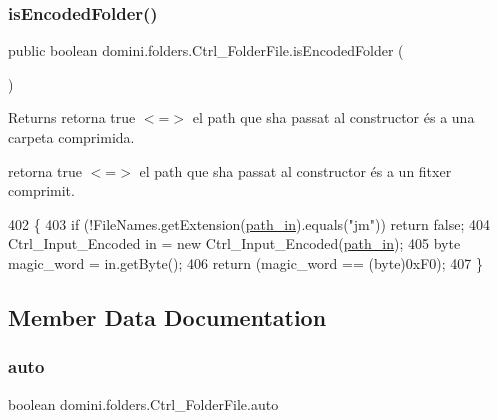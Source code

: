 \subsubsection{\texorpdfstring{is\+Encoded\+Folder()}{isEncodedFolder()}}
{\footnotesize\ttfamily public boolean domini.\+folders.\+Ctrl\+\_\+\+Folder\+File.\+is\+Encoded\+Folder (\begin{DoxyParamCaption}{ }\end{DoxyParamCaption})\hspace{0.3cm}{\ttfamily [inline]}}

\begin{DoxyReturn}{Returns}
retorna true $<$=$>$ el path que s\textquotesingle{}ha passat al constructor és a una carpeta comprimida.

retorna true $<$=$>$ el path que s\textquotesingle{}ha passat al constructor és a un fitxer comprimit. 
\end{DoxyReturn}

\begin{DoxyCode}
402                                      \{
403         \textcolor{keywordflow}{if} (!FileNames.getExtension(\hyperlink{classdomini_1_1folders_1_1Ctrl__FolderFile_a0d3946bb2832a1f34d0c2227df5c71c4}{path\_in}).equals(\textcolor{stringliteral}{"jm"})) \textcolor{keywordflow}{return} \textcolor{keyword}{false};
404         Ctrl\_Input\_Encoded in = \textcolor{keyword}{new} Ctrl\_Input\_Encoded(\hyperlink{classdomini_1_1folders_1_1Ctrl__FolderFile_a0d3946bb2832a1f34d0c2227df5c71c4}{path\_in});
405         byte magic\_word = in.getByte();
406         \textcolor{keywordflow}{return} (magic\_word == (byte)0xF0);
407     \}
\end{DoxyCode}


\subsection{Member Data Documentation}
\mbox{\label{classdomini_1_1folders_1_1Ctrl__FolderFile_a522ecbf2a1426984671134e062491b75}} 
\subsubsection{\texorpdfstring{auto}{auto}}
{\footnotesize\ttfamily boolean domini.\+folders.\+Ctrl\+\_\+\+Folder\+File.\+auto\hspace{0.3cm}{\ttfamily [private]}}

